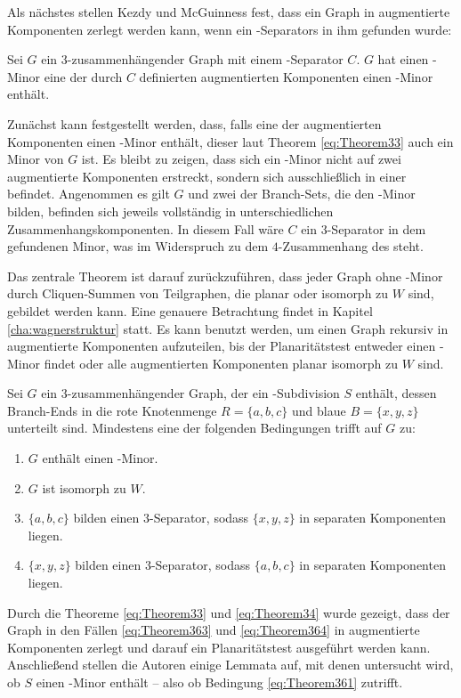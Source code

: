 Als nächstes stellen Kezdy und McGuinness fest, dass ein Graph in augmentierte Komponenten zerlegt werden kann, wenn ein \dd-Separators in ihm gefunden wurde:
\begin{theorem}\label{eq:Theorem34}
  Sei $G$ ein $3$-zusammenhängender Graph mit einem \dd-Separator $C$.
  $G$ hat einen \kf-Minor \gdw eine der durch $C$ definierten augmentierten Komponenten einen \kf-Minor enthält.
  \cite{KeM92}
\end{theorem}
\begin{beweis}
  Zunächst kann festgestellt werden, dass, falls eine der augmentierten Komponenten einen \kf-Minor enthält, dieser laut Theorem \ref{eq:Theorem33} auch ein Minor von $G$ ist.
  Es bleibt zu zeigen, dass sich ein \kf-Minor nicht auf zwei augmentierte Komponenten erstreckt, sondern sich ausschließlich in einer befindet.
  Angenommen es gilt \kf \minor $G$ und zwei der Branch-Sets, die den \kf-Minor bilden, befinden sich jeweils vollständig in unterschiedlichen Zusammenhangskomponenten.
  In diesem Fall wäre $C$ ein $3$-Separator in dem gefundenen Minor, was im Widerspruch zu dem $4$-Zusammenhang des \kf steht.
  \cite{KeM92}
\end{beweis}

Das zentrale Theorem ist darauf zurückzuführen, dass jeder Graph ohne \kf-Minor durch Cliquen-Summen von Teilgraphen, die planar oder isomorph zu $W$ sind, gebildet werden kann\cite{Wag37}.
Eine genauere Betrachtung findet in Kapitel \ref{cha:wagnerstruktur} statt.
Es kann benutzt werden, um einen Graph rekursiv in augmentierte Komponenten aufzuteilen, bis der Planaritätstest entweder einen \kf-Minor findet oder alle augmentierten Komponenten planar \bzw isomorph zu $W$ sind.
\begin{theorem}\label{eq:Theorem36}
  Sei $G$ ein $3$-zusammenhängender Graph, der ein \kdd-Subdivision $S$ enthält, dessen Branch-Ends in die rote Knotenmenge $R = \{a, b, c\}$ und blaue $B = \{x, y, z\}$ unterteilt sind.
  Mindestens eine der folgenden Bedingungen trifft auf $G$ zu:
  \begin{enumerate}
    \item $G$ enthält einen \kf-Minor.\label{eq:Theorem361}
    \item $G$ ist isomorph zu $W$.\label{eq:Theorem362}
    \item $\{a, b, c\}$ bilden einen $3$-Separator, sodass $\{x, y, z\}$ in separaten Komponenten liegen.\label{eq:Theorem363}
    \item $\{x, y, z\}$ bilden einen $3$-Separator, sodass $\{a, b, c\}$ in separaten Komponenten liegen.\label{eq:Theorem364}
  \end{enumerate}
  \cite{KeM92}
\end{theorem}
Durch die Theoreme \ref{eq:Theorem33} und \ref{eq:Theorem34} wurde gezeigt, dass der Graph in den Fällen \ref{eq:Theorem363} und \ref{eq:Theorem364} in augmentierte Komponenten zerlegt und darauf ein Planaritätstest ausgeführt werden kann.
Anschließend stellen die Autoren einige Lemmata auf, mit denen untersucht wird, ob $S$ einen \kf-Minor enthält -- also ob Bedingung \ref{eq:Theorem361} zutrifft.

